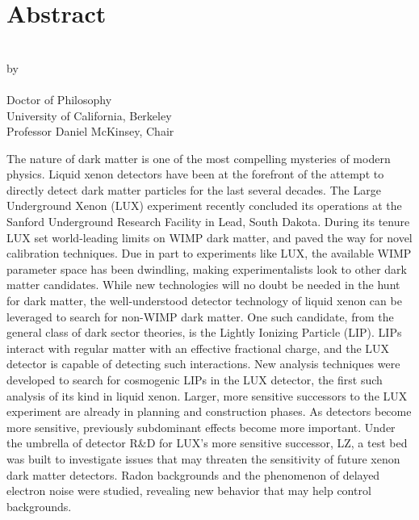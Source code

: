 


\begingroup
\let\clearpage\relax
\let\cleardoublepage\relax
\let\cleardoublepage\relax

\chapter*{Abstract}

\begin{center}
\myTitle \\ \bigskip
by \\ \bigskip
\myName \\ \bigskip
Doctor of Philosophy \\ \smallskip
University of California, Berkeley \\ \smallskip
Professor Daniel McKinsey, Chair \\
\end{center}

\vspace{2cm}

\noindent The nature of dark matter is one of the most compelling mysteries of modern physics. Liquid xenon detectors have been at the forefront of the attempt to directly detect dark matter particles for the last several decades. The Large Underground Xenon (LUX) experiment recently concluded its operations at the Sanford Underground Research Facility in Lead, South Dakota. During its tenure LUX set world-leading limits on WIMP dark matter, and paved the way for novel calibration techniques. Due in part to experiments like LUX, the available WIMP parameter space has been dwindling, making experimentalists look to other dark matter candidates. While new technologies will no doubt be needed in the hunt for dark matter, the well-understood detector technology of liquid xenon can be leveraged to search for non-WIMP dark matter. One such candidate, from the general class of dark sector theories, is the Lightly Ionizing Particle (LIP). LIPs interact with regular matter with an effective fractional charge, and the LUX detector is capable of detecting such interactions. New analysis techniques were developed to search for cosmogenic LIPs in the LUX detector, the first such analysis of its kind in liquid xenon. Larger, more sensitive successors to the LUX experiment are already in planning and construction phases. As detectors become more sensitive, previously subdominant effects become more important. Under the umbrella of detector R\&D for LUX's more sensitive successor, LZ, a test bed was built to investigate issues that may threaten the sensitivity of future xenon dark matter detectors. Radon backgrounds and the phenomenon of delayed electron noise were studied, revealing new behavior that may help control backgrounds.

\endgroup			

\vfill
